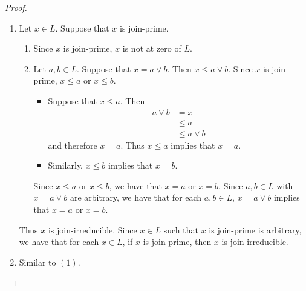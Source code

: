 \documentclass{book}
\begin{document}
	\begin{proof}\
		\begin{enumerate}
			\item Let $x \in L$. Suppose that $x$ is join-prime. 
			\begin{enumerate}
				\item Since $x$ is join-prime, $x$ is not at zero of $L$.
				\item Let $a,b \in L$. Suppose that $x = a \vee b$. Then $x \leq a \vee b$. Since $x$ is join-prime, $x \leq a$ or $x \leq b$. 
				\begin{itemize}
					\item Suppose that $x \leq a$. Then 
					\begin{align*}
						a \vee b
						& = x \\
						& \leq a \\
						& \leq a \vee b
					\end{align*}
					and therefore $x = a$. Thus $x \leq a$ implies that $x = a$.
					\item Similarly, $x \leq b$ implies that $x = b$. 
				\end{itemize}
				Since $x \leq a$ or $x \leq b$, we have that $x = a$ or $x = b$. Since $a,b \in L$ with $x = a \vee b$ are arbitrary, we have that for each $a,b \in L$, $x = a \vee b$ implies that $x = a$ or $x = b$.
			\end{enumerate} 
			Thus $x$ is join-irreducible. Since $x \in L$ such that $x$ is join-prime is arbitrary, we have that for each $x \in L$, if $x$ is join-prime, then $x$ is join-irreducible.
			\item Similar to $(1)$. 
		\end{enumerate}
	\end{proof}
	
	
	
	
	
	
	
	
	
	
	
	
	
	
	
	
	
	
	
	
	
	
	
	
	
	
	
	
	
	
	
	
	
	
	
	
	
\end{document}
